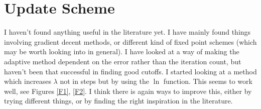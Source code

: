 \documentclass[11pt, a4paper]{article}
\theoremstyle{definition}
\begin{document}
	
\section{Update Scheme}
I haven't found anything useful in the literature yet. I have mainly found things involving gradient decent methods, or different kind of fixed point schemes (which may be worth looking into in general).
I have looked at a way of making the adaptive method dependent on the error rather than the iteration count, but haven't been that successful in finding good cutoffs.
I started looking at a method which increases $\lambda$ not in steps but by using the $\ln$ function. This seems to work well, see Figures \ref{F1}, \ref{F2}. I think there is again ways to improve this, either by trying different things, or by finding the right inspiration in the literature. 
\end{document}
